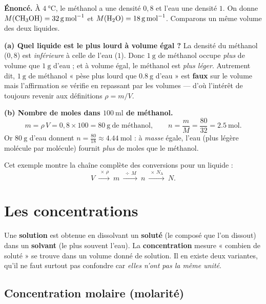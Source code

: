 \documentclass[11pt,a4paper]{article}
\newcommand{\NA}{N_{\!\text{A}}}
\begin{document}
\begin{exemple}
\textbf{Énoncé.} À $\SI{4}{\celsius}$, le méthanol  a une densité $0{,}8$ et l'eau une
densité $1$. On donne $M(\ce{CH3OH}) = \SI{32}{\gram\per\mole}$ et $M(\ce{H2O}) = \SI{18}{\gram\per\mole}$.
Comparons un même volume des deux liquides.

\smallskip
\textbf{(a) Quel liquide est le plus lourd à volume égal ?} La densité du méthanol ($0{,}8$) est
\emph{inférieure} à celle de l'eau ($1$). Donc $\SI{1}{\gram}$ de méthanol occupe \emph{plus} de
volume que $\SI{1}{\gram}$ d'eau ; et à volume égal, le méthanol est \emph{plus léger}. Autrement
dit, $\SI{1}{\gram}$ de méthanol « pèse plus lourd que $\SI{0.8}{\gram}$ d'eau » est \textbf{faux}
sur le volume mais l'affirmation se vérifie en repassant par les volumes — d'où l'intérêt de toujours
revenir aux définitions $\rho = m/V$.

\smallskip
\textbf{(b) Nombre de moles dans $\SI{100}{\milli\litre}$ de méthanol.}
\[ m = \rho\,V = 0{,}8 \times 100 = \SI{80}{\gram} \ \text{de méthanol}, \qquad
   n = \frac{m}{M} = \frac{80}{32} = \SI{2.5}{\mole}. \]
Or $\SI{80}{\gram}$ d'eau donnent $n = \frac{80}{18} \approx \SI{4.44}{\mole}$ : à \emph{masse} égale,
l'eau (plus légère molécule par molécule) fournit \emph{plus} de moles que le méthanol.

\smallskip
Cet exemple montre la chaîne complète des conversions pour un liquide :
\[ V \ \xrightarrow{\ \times\,\rho\ }\ m \ \xrightarrow{\ \div\,M\ }\ n
   \ \xrightarrow{\ \times\,\NA\ }\ N. \]
\end{exemple}

\section{Les concentrations}
Une \textbf{solution} est obtenue en dissolvant un \textbf{soluté} (le composé que l'on dissout) dans
un \textbf{solvant} (le plus souvent l'eau). La \textbf{concentration} mesure « combien de soluté »
se trouve dans un volume donné de solution. Il en existe deux variantes, qu'il ne faut surtout pas
confondre car \emph{elles n'ont pas la même unité}.

\subsection{Concentration molaire (molarité)}
\end{document}
